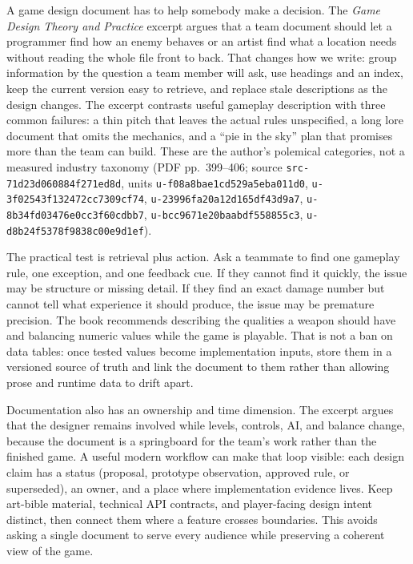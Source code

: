 A game design document has to help somebody make a decision. The \emph{Game Design Theory and Practice} excerpt argues that a team document should let a programmer find how an enemy behaves or an artist find what a location needs without reading the whole file front to back. That changes how we write: group information by the question a team member will ask, use headings and an index, keep the current version easy to retrieve, and replace stale descriptions as the design changes. The excerpt contrasts useful gameplay description with three common failures: a thin pitch that leaves the actual rules unspecified, a long lore document that omits the mechanics, and a ``pie in the sky'' plan that promises more than the team can build. These are the author's polemical categories, not a measured industry taxonomy (PDF pp.~399--406; source \texttt{src-71d23d060884f271ed8d}, units \texttt{u-f08a8bae1cd529a5eba011d0}, \texttt{u-3f02543f132472cc7309cf74}, \texttt{u-23996fa20a12d165df43d9a7}, \texttt{u-8b34fd03476e0cc3f60cdbb7}, \texttt{u-bcc9671e20baabdf558855c3}, \texttt{u-d8b24f5378f9838c00e9d1ef}).

The practical test is retrieval plus action. Ask a teammate to find one gameplay rule, one exception, and one feedback cue. If they cannot find it quickly, the issue may be structure or missing detail. If they find an exact damage number but cannot tell what experience it should produce, the issue may be premature precision. The book recommends describing the qualities a weapon should have and balancing numeric values while the game is playable. That is not a ban on data tables: once tested values become implementation inputs, store them in a versioned source of truth and link the document to them rather than allowing prose and runtime data to drift apart.

Documentation also has an ownership and time dimension. The excerpt argues that the designer remains involved while levels, controls, AI, and balance change, because the document is a springboard for the team's work rather than the finished game. A useful modern workflow can make that loop visible: each design claim has a status (proposal, prototype observation, approved rule, or superseded), an owner, and a place where implementation evidence lives. Keep art-bible material, technical API contracts, and player-facing design intent distinct, then connect them where a feature crosses boundaries. This avoids asking a single document to serve every audience while preserving a coherent view of the game.

